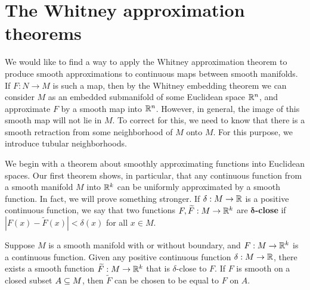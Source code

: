 \section{The Whitney approximation theorems}
We would like to find a way to apply the Whitney approximation theorem to produce smooth approximations to continuous maps between smooth manifolds. If $F:N\to M$ is such a map, then by the Whitney embedding theorem we can consider $M$ as an embedded submanifold of some Euclidean space $\mathbb{R}^n$, and approximate $F$ by a smooth map into $\mathbb{R}^n$. However, in general, the image of this smooth map will not lie in $M$. To correct for this, we need to know that there is a smooth retraction from some neighborhood of $M$ onto $M$. For this purpose, we introduce tubular neighborhoods.\par
We begin with a theorem about smoothly approximating functions into Euclidean spaces. Our first theorem shows, in particular, that any continuous function from a
smooth manifold $M$ into $\mathbb{R}^k$ can be uniformly approximated by a smooth function. In fact, we will prove something stronger. If $\delta:M\to\mathbb{R}$ is a positive continuous function, we say that two functions $F,\widetilde{F}:M\to\mathbb{R}^k$ are \textbf{$\bm{\delta}$-close} if $|F(x)-\widetilde{F}(x)|<\delta(x)$ for all $x\in M$.
\begin{theorem}\label{Whitney appox function}
Suppose $M$ is a smooth manifold with or without boundary, and $F:M\to\mathbb{R}^k$ is a continuous function. Given any positive continuous function $\delta:M\to\mathbb{R}$, there exists a smooth function $\widetilde{F}:M\to\mathbb{R}^k$ that is $\delta$-close to $F$. If $F$ is smooth on a closed subset $A\subseteq M$, then $\widetilde{F}$ can be chosen to be equal to $F$ on $A$.
\end{theorem}
